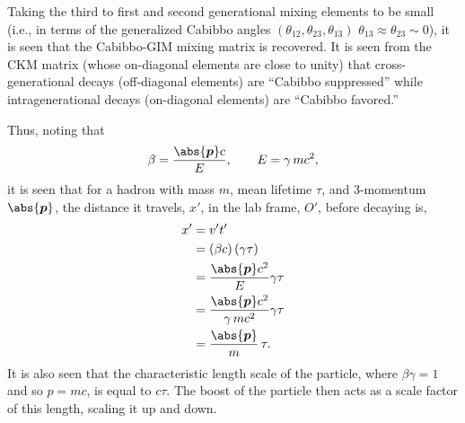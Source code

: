 Taking the third to first and second generational mixing elements to be small (i.e., in terms of the generalized Cabibbo angles $(\theta_{12},\theta_{23},\theta_{13})$ $\theta_{13} \approx \theta_{23} \sim 0$), it is seen that the Cabibbo-GIM mixing matrix is recovered.
It is seen from the CKM matrix (whose on-diagonal elements are close to unity) that cross-generational decays (off-diagonal elements) are ``Cabibbo suppressed'' while intragenerational decays (on-diagonal elements) are ``Cabibbo favored.''

Thus, noting that
\[
 \beta = \frac{\abs{\vec{p}}c}{E}, \qquad E = \gamma\, mc^2,
\]
it is seen that for a hadron with mass $m$, mean lifetime $\tau$, and 3-momentum $\abs{\vec{p}}$, the distance it travels, $x'$, in the lab frame, $O'$, before decaying is,
\[
 \begin{split}
  x'	&= v' t'	\\
  &= \left(\beta c\right) \left(\gamma \tau\right)	\\
  &= \frac{\abs{\vec{p}}c^2}{E} \gamma \tau	\\
  &= \frac{\abs{\vec{p}}c^2}{\gamma\, mc^2} \gamma \tau	\\
  &= \frac{\abs{\vec{p}}}{m}\, \tau.
 \end{split}
\]
It is also seen that the characteristic length scale of the particle, where $\beta\gamma=1$ and so $p=mc$, is equal to $c\tau$.
The boost of the particle then acts as a scale factor of this length, scaling it up and down.

